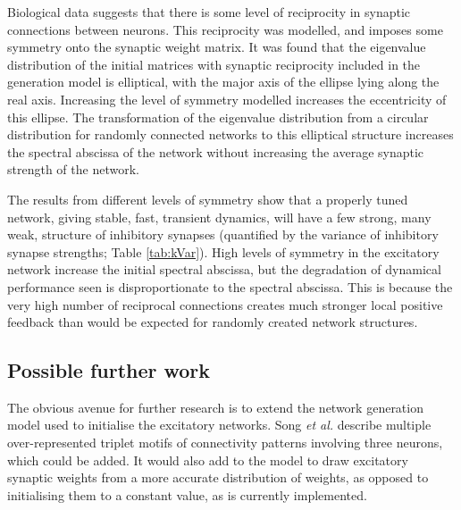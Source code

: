 \documentclass[12pt, a4paper]{article}
\begin{document}
Biological data suggests that there is some level of reciprocity in synaptic connections between neurons.  This reciprocity was modelled, and imposes some symmetry onto the synaptic weight matrix.  It was found that the eigenvalue distribution of the initial matrices with synaptic reciprocity included in the generation model is elliptical, with the major axis of the ellipse lying along the real axis.  Increasing the level of symmetry modelled increases the eccentricity of this ellipse.  The transformation of the eigenvalue distribution from a circular distribution for randomly connected networks to this elliptical structure increases the spectral abscissa of the network without increasing the average synaptic strength of the network. 

The results from different levels of symmetry show that a properly tuned network, giving stable, fast, transient dynamics, will have a few strong, many weak, structure of inhibitory synapses (quantified by the variance of inhibitory synapse strengths; Table \ref{tab:kVar}).  High levels of symmetry in the excitatory network increase the initial spectral abscissa, but the degradation of dynamical performance seen is disproportionate to the spectral abscissa.  This is because the very high number of reciprocal connections creates much stronger local positive feedback than would be expected for randomly created network structures.


\subsection*{Possible further work}
The obvious avenue for further research is to extend the network generation model used to initialise the excitatory networks.  Song \emph{et al.} describe multiple over-represented triplet motifs of connectivity patterns involving three neurons, which could be added.  It would also add to the model to draw excitatory synaptic weights from a more accurate distribution of weights, as opposed to initialising them to a constant value, as is currently implemented.
\end{document}
